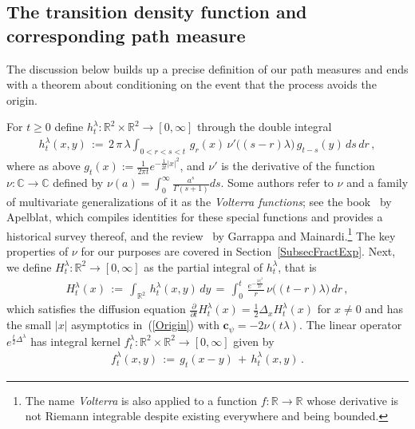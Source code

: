 \documentclass[10pt]{article}
\numberwithin{equation}{section}
\theoremstyle{definition}
\newcommand{\R}{{\mathbb R}}
\newcommand{\C}{{\mathbb C}}
\begin{document}
\subsection{The transition density function and corresponding path measure}\label{SubSecTransProb}  
The discussion below  builds up  a precise definition of our path measures and ends with a  theorem about conditioning on  the event that the process avoids the origin.
 
 For $t\geq 0$ define $h_{t}^{\lambda}:\R^2\times \R^2\rightarrow [0,\infty]$ through the double integral
\begin{align}\label{DefLittleH}
      h_{t}^{\lambda}(x, y)\,:=\, 2\,\pi\, \lambda \int_{0 < r < s < t}\,g_{r}( x)\,\nu'\big((s-r)\lambda\big)\,g_{t-s}(y)\,ds\,dr\,,
\end{align}
where as above $g_t(x):=\frac{ 1  }{ 2\pi t } e^{-\frac{1}{2t}|x|^2}$,  and $\nu'$ is the derivative of the function $\nu:\C\rightarrow \C$ defined by  $\nu(a)=\int_0^{\infty}\frac{ a^{s} }{\Gamma(s+1) }ds  $. Some authors  refer to  $\nu$ and a family of multivariate generalizations of it as the \textit{Volterra functions}; see the book~\cite{Apelblat0} by Apelblat, which compiles identities for these special functions and provides a historical survey thereof, and the  review~\cite{Garrappa} by Garrappa and Mainardi.\footnote{The name \textit{Volterra} is also applied to a function $f:\R\rightarrow \R$ whose derivative is not Riemann integrable despite existing everywhere and being bounded.}  The key properties of $\nu$ for our purposes are covered in  Section~\ref{SubsecFractExp}.  Next, we  define $H_{t}^{\lambda}:\R^2\rightarrow [0,\infty]$ as the partial integral of $h_{t}^{\lambda}$, that is
\begin{align}\label{DefH}
H_t^{\lambda}(x)\,:=\, \int_{\R^2}\,h_{t}^{\lambda}(x, y)\, dy\,=\,   \int_{0 }^t \,\frac{e^{-\frac{|x|^2}{2r}} }{r }\,\nu\big((t-r)\lambda\big)\,dr\,,
\end{align}
which satisfies the diffusion equation $    \frac{\partial}{\partial t} H_{ t}^{\lambda}(x)=\frac{1}{2}\Delta_x H_{ t}^{\lambda}(x) $
for $x\neq 0$ and has the small $|x|$ asymptotics in~(\ref{Origin}) with $\mathbf{c}_{\psi}=-2\nu(t\lambda) $.  The linear operator $e^{ \frac{t}{2}\Delta^{\lambda}  } $ has integral kernel $f_{t}^{\lambda}:\R^2\times \R^2\rightarrow [0,\infty]$ given by
\begin{align}\label{DefFullKer}
 f_{t}^{ \lambda}(x,y)\,:=\, g_{t}(x-y) \,+\,h_{t}^{ \lambda}(x,y) \,.
\end{align}
\end{document}
